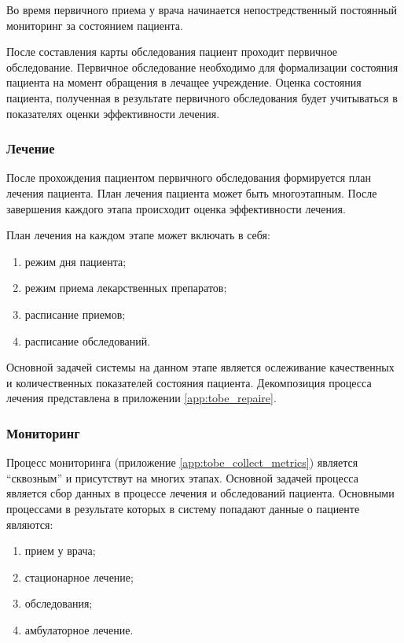 Во время первичного приема у врача начинается непостредственный постоянный
мониторинг за состоянием пациента.

После составления карты обследования пациент проходит первичное обследование.
Первичное обследование необходимо для формализации состояния пациента на момент
обращения в лечащее учреждение. Оценка состояния пациента, полученная в
результате первичного обследования будет учитываться в показателях оценки
эффективности лечения.

\subsubsection{Лечение}
После прохождения пациентом первичного обследования формируется план лечения
пациента. План лечения пациента может быть многоэтапным. После завершения
каждого этапа происходит оценка эффективности лечения.

План лечения на каждом этапе может включать в себя:

\begin{enumerate}
  \item режим дня пациента;
  \item режим приема лекарственных препаратов;
  \item расписание приемов;
  \item расписание обследований.    
\end{enumerate}

Основной задачей системы на данном этапе является ослеживание качественных и
количественных показателей состояния пациента. Декомпозиция процесса лечения
представлена в приложении \ref{app:tobe_repaire}.

\subsubsection{Мониторинг}
Процесс мониторинга (приложение \ref{app:tobe_collect_metrics}) является “сквозным” и присутствут на
многих этапах.
Основной задачей процесса является сбор данных в процессе лечения и обследований
пациента.
Основными процессами в результате которых в систему попадают данные о пациенте
являются:

\begin{enumerate}
  \item прием у врача;
  \item стационарное лечение;
  \item обследования;
  \item амбулаторное лечение. 
\end{enumerate}

